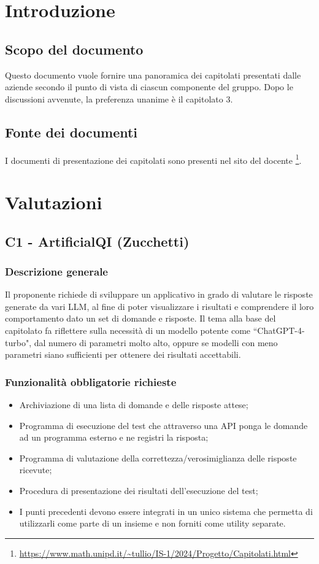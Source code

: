 \documentclass[10pt]{article}
\begin{document}
\newpage
\tableofcontents{\newpage}

\section{Introduzione}
\subsection{Scopo del documento}
Questo documento vuole fornire una panoramica dei capitolati presentati dalle aziende secondo il punto di vista di ciascun componente del gruppo. Dopo le discussioni avvenute, la preferenza unanime è il capitolato 3.
\subsection{Fonte dei documenti}
I documenti di presentazione dei capitolati sono presenti nel sito del docente \footnote{\url{https://www.math.unipd.it/~tullio/IS-1/2024/Progetto/Capitolati.html}}.

\subsectionfont{\color{orange}}  %

\section{Valutazioni}
\subsection{C1 - ArtificialQI (Zucchetti)}
\subsubsection{Descrizione generale}
Il proponente richiede di sviluppare un applicativo in grado di valutare le risposte generate da vari LLM, al fine di poter visualizzare i risultati e comprendere il loro comportamento dato un set di domande e risposte. Il tema alla base del capitolato fa riflettere sulla necessità di un modello potente come ``ChatGPT-4-turbo", dal numero di parametri molto alto, oppure se modelli con meno parametri siano sufficienti per ottenere dei risultati accettabili.
\subsubsection{Funzionalità obbligatorie richieste}
\begin{itemize}
    \item Archiviazione di una lista di domande e delle risposte attese;
    \item Programma di esecuzione del test che attraverso una API ponga le domande ad un programma esterno e ne registri la risposta;
    \item Programma di valutazione della correttezza/verosimiglianza delle risposte ricevute;
    \item Procedura di presentazione dei risultati dell’esecuzione del test;
    \item I punti precedenti devono essere integrati in un unico sistema che permetta di utilizzarli come parte di un insieme e non forniti come utility separate.
\end{itemize}
\end{document}
